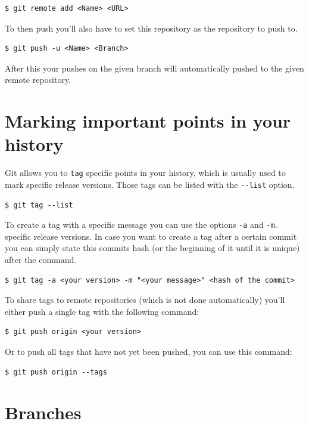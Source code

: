 \documentclass[a4paper, 12pt]{article}
\begin{document}
		\begin{lstlisting}
$ git remote add <Name> <URL>
		\end{lstlisting}
		
		To then push you'll also have to set this repository as the repository to push to.
		
		\begin{lstlisting}
$ git push -u <Name> <Branch>
		\end{lstlisting}
		
		After this your pushes on the given branch will automatically pushed to the given remote repository.

	\section{Marking important points in your history}
	
		Git allows you to \lstinline|tag| specific points in your history, which is usually used to mark specific release versions. Those tags can be listed with the \lstinline|--list| option.
		
		\begin{lstlisting}
$ git tag --list
		\end{lstlisting}
		
		To create a tag with a specific message you can use the options \lstinline|-a| and \lstinline|-m|. specific release versions. In case you want to create a tag after a certain commit you can simply state this commits hash (or the beginning of it until it is unique) after the command.
		
		\begin{lstlisting}
$ git tag -a <your version> -m "<your message>" <hash of the commit>
		\end{lstlisting}
		
		To share tags to remote repositories (which is not done automatically) you'll either push a single tag with the following command: 
		
		\begin{lstlisting}
$ git push origin <your version>
		\end{lstlisting}
		
		Or to push all tags that have not yet been pushed, you can use this command:
		
		\begin{lstlisting}
$ git push origin --tags
		\end{lstlisting}
		\newpage
			
	\section{Branches}
	
\end{document}
